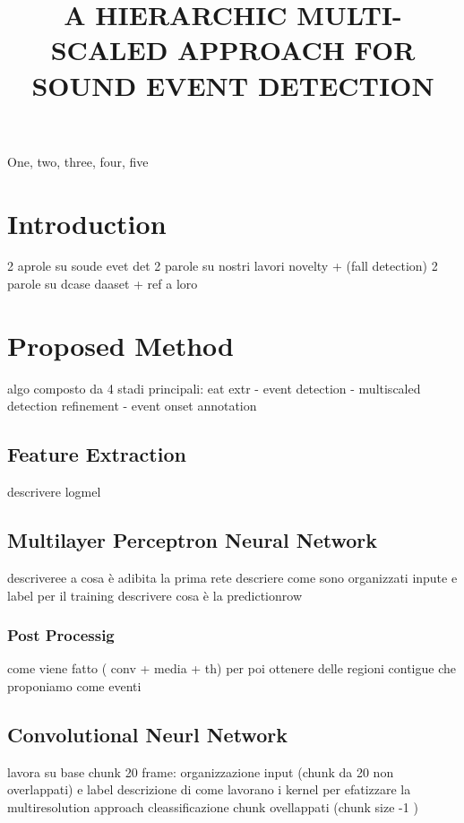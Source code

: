 \documentclass{article}
\title{A HIERARCHIC MULTI-SCALED APPROACH FOR SOUND EVENT DETECTION}
\begin{document}
\ninept
\maketitle

\begin{sloppy}

\begin{abstract}

\end{abstract}

\begin{keywords}
One, two, three, four, five
\end{keywords}


\section{Introduction}
\label{sec:intro}

\label{sec:format}
2 aprole su soude evet det
2 parole su nostri lavori novelty + (fall detection)
2 parole su dcase daaset + ref a loro



\section{Proposed Method}
\label{sec:pagelimit}
algo composto da 4 stadi principali: eat extr - event detection - multiscaled detection refinement - event onset annotation 
\subsection{Feature Extraction}
descrivere logmel
\subsection{Multilayer Perceptron Neural Network}
descriveree a cosa è adibita la prima rete
descriere come sono organizzati inpute e label per il training
descrivere cosa è la predictionrow
\subsubsection{Post Processig }
come viene fatto ( conv + media + th) 
per poi ottenere delle regioni contigue che proponiamo come eventi
\subsection{Convolutional Neurl Network}
lavora su base chunk 20 frame: organizzazione input (chunk da 20 non overlappati) e label 
descrizione di come lavorano i kernel per efatizzare la multiresolution approach
cleassificazione chunk ovellappati (chunk size -1 )

\end{sloppy}
\end{document}
